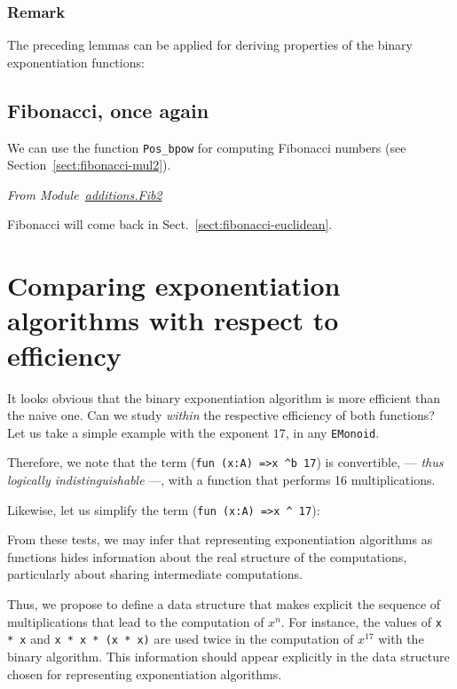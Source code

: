  

\subsubsection{Remark}
The preceding lemmas can be applied for deriving properties of the binary exponentiation 
functions:



\subsection{Fibonacci, once again}
\label{sect:fibonacci-pos-bpow}

We can use the function \texttt{Pos\_bpow} for computing Fibonacci numbers
(see Section~\vref{sect:fibonacci-mul2}).

\emph{From Module~\href{../theories/html/additions.Fib2.html}{additions.Fib2}}



Fibonacci will come back in Sect.~\vref{sect:fibonacci-euclidean}.


\section{Comparing exponentiation algorithms with respect to efficiency}

It looks obvious that  the binary exponentiation algorithm is more efficient than the 
naive one. Can we study \emph{within \coq{}} the respective efficiency of both functions?
Let us take a simple example with the exponent $17$,  in any \texttt{EMonoid}.


Therefore, we note that the term (\Verb|fun (x:A) =>x ^b 17|)  is
convertible, --- \emph{thus logically indistinguishable} ---, with a function that performs 16 multiplications.

Likewise, let us simplify the term (\Verb|fun (x:A) =>x ^ 17|):





From these tests, we may infer that  representing exponentiation algorithms as \coq{}  functions hides
information about the real structure of the computations, particularly about  sharing intermediate computations.

Thus, we propose to define a data structure that makes explicit the sequence of multiplications that lead to the computation of $x^n$. For instance, the values of  
\texttt{x * x} and
\texttt{x * x * (x * x)}  are used
twice in the  computation of $x^{17}$ with the binary algorithm. This information should 
appear explicitly in the data structure chosen for representing exponentiation 
algorithms.

